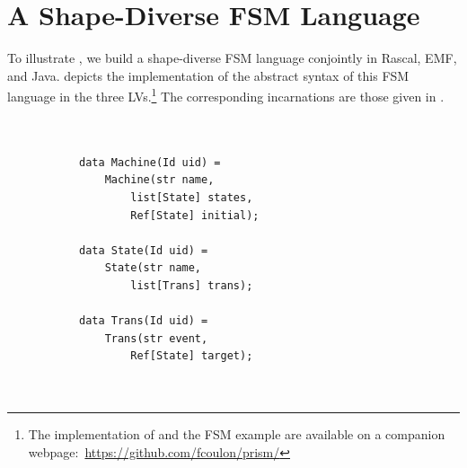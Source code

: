 \section{A Shape-Diverse FSM Language}
\label{sec:eval}

To illustrate \prism, we build a shape-diverse FSM language conjointly in Rascal, EMF, and Java.
 depicts the implementation of the abstract syntax of this FSM language in the three LVs.\footnote{The implementation of \prism and the FSM example are available on a companion webpage:~\url{https://github.com/fcoulon/prism/}}
The corresponding incarnations are those given in .

\begin{figure}[bt]
	\centering
	\begin{subfigure}[t]{.3\columnwidth}
		\vskip 0pt
		\begin{lstlisting}[label=lst:fsm-adt, language=Rascal, numbers=none, xleftmargin=0pt, tabsize=1, aboveskip=0pt, belowskip=0pt, abovecaptionskip=0pt, showlines=true]


data Machine(Id uid) =
	Machine(str name,
		list[State] states,
		Ref[State] initial);

data State(Id uid) =
	State(str name,
		list[Trans] trans);

data Trans(Id uid) =
	Trans(str event,
		Ref[State] target);



\end{lstlisting}
\end{subfigure}
\end{figure}
